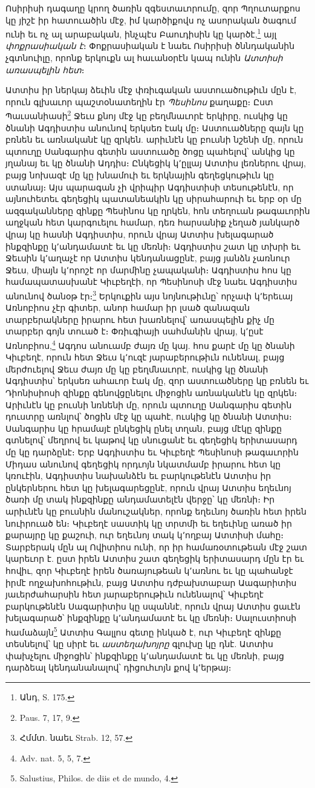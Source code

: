 \documentclass{article}
\begin{document}
{Ոսիրիսի դագաղը կրող ծառին զգեստաւորումը, զոր Պղուտարքոս կը յիշէ իր հատուածին մէջ, իմ կարծիքովս ոչ ասորական ծագում ունի եւ ոչ ալ արաբական, ինչպէս Բաուդիսին կը կարծէ,\footnote{Անդ, S. 175.} այլ \emph{փոքրասիական է}։ Փոքրասիական է նաեւ Ոսիրիսի ծննդականին չգտնուիլը, որոնք երկուքն ալ հաւանօրէն կապ ունին \emph{Ատտիսի առասպելին հետ}։

Ատտիս իր ներկայ ձեւին մէջ փռիւգական աստուածութիւն մըն է, որուն գլխաւոր պաշտօնատեղին էր \emph{Պեսինոս} քաղաքը։ Ըստ Պաւսանիասի\footnote{Paus. 7, 17, 9.} Ջեւս քնոյ մէջ կը բեղմնաւորէ երկիրը, ուսկից կը ծնանի Ագդիստիս անունով երկսեռ էակ մը։ Աստուածները զայն կը բռնեն եւ առնականէ կը զրկեն. արիւնէն կը բուսնի նշենի մը, որուն պտուղը Սանգարիս գետին աստուածը ծոցը պահելով՝ անկից կը յղանայ եւ կը ծնանի Ադդիս։ Ընկեցիկ կ՚ըլլայ Ատտիս լեռներու վրայ, բայց նոխազէ մը կը խնամուի եւ երկնային գեղեցկութիւն կը ստանայ։ Այս պարագան չի վրիպիր Ագդիստիսի տեսութենէն, որ այնուհետեւ գեղեցիկ պատանեակին կը սիրահարուի եւ երբ օր մը ազգականները զինքը Պեսինոս կը ղրկեն, հոն տեղուան թագաւորին աղջկան հետ կարգուելու համար, դեռ հարսանիք չեղած յանկարծ վրայ կը հասնի Ագդիստիս, որուն վրայ Ատտիս խելագարած ինքզինքը կ՚անդամատէ եւ կը մեռնի։ Ագդիստիս շատ կը տխրի եւ Ջեւսին կ՚աղաչէ որ Ատտիս կենդանացընէ, բայց յանձն չառնուր Ջեւս, միայն կ՚որոշէ որ մարմինը չապականի։ Ագդիստիս հոս կը համապատասխանէ Կիւբեղէի, որ Պեսինոսի մէջ նաեւ Ագդիստիս անունով ծանօթ էր։\footnote{Հմմտ. նաեւ Strab. 12, 57.} Երկուքին այս նոյնութիւնը՝ որչափ կ՚երեւայ Առնոբիոս չէր գիտեր, անոր համար իր լսած զանազան տարբերակները իրարու հետ խառնելով՝ առասպելին քիչ մը տարբեր գոյն տուած է։ Փռիւգիայի սահմանին վրայ, կ՚ըսէ Առնոբիոս,\footnote{Adv. nat. 5, 5, 7.} Ագդոս անուամբ ժայռ մը կայ. հոս քարէ մը կը ծնանի Կիւբեղէ, որուն հետ Ջեւս կ՚ուզէ յարաբերութիւն ունենալ, բայց մերժուելով Ջեւս ժայռ մը կը բեղմնաւորէ, ուսկից կը ծնանի Ագդիստիս՝ երկսեռ ահաւոր էակ մը, զոր աստուածները կը բռնեն եւ Դիոնիսիոսի զինքը գենովցընելու միջոցին առնականէն կը զրկեն։ Արիւնէն կը բուսնի նռնենի մը, որուն պտուղը Սանգարիս գետին դուստրը առնլով՝ ծոցին մէջ կը պահէ, ուսկից կը ծնանի Ատտիս։ Սանգարիս կը հրամայէ ընկեցիկ ընել տղան, բայց մէկը զինքը գտնելով՝ մեղրով եւ կաթով կը սնուցանէ եւ գեղեցիկ երիտասարդ մը կը դարձընէ։ Երբ Ագդիստիս եւ Կիւբեղէ Պեսինոսի թագաւորին Միդաս անունով գեղեցիկ որդւոյն նկատմամբ իրարու հետ կը կռուէին, Ագդիստիս նախանձէն եւ բարկութենէն Ատտիս իր ընկերներու հետ կը խելագարեցընէ, որուն վրայ Ատտիս եղեւնոյ ծառի մը տակ ինքզինքը անդամատելէն վերջը՝ կը մեռնի։ Իր արիւնէն կը բուսնին մանուշակներ, որոնք եղեւնոյ ծառին հետ իրեն նուիրուած են։ Կիւբեղէ սաստիկ կը տրտմի եւ եղեւինը առած իր քարայրը կը քաշուի, ուր եղեւնոյ տակ կ՚ողբայ Ատտիսի մահը։ Տարբերակ մըն ալ Ովիտիոս ունի, որ իր համառօտութեան մէջ շատ կարեւոր է. ըստ իրեն Ատտիս շատ գեղեցիկ երիտասարդ մըն էր եւ հովիւ, զոր Կիւբեղէ իրեն ծառայութեան կ՚առնու եւ կը պահանջէ իրմէ ողջախոհութիւն, բայց Ատտիս դժբախտաբար Աագարիտիս յաւերժահարսին հետ յարաբերութիւն ունենալով՝ Կիւբեղէ բարկութենէն Սագարիտիս կը սպաննէ, որուն վրայ Ատտիս ցաւէն խելագարած՝ ինքզինքը կ՚անդամատէ եւ կը մեռնի։ Սալուստիոսի համաձայն\footnote{Salustius, Philos. de diis et de mundo, 4.} Ատտիս Գալլոս գետը ինկած է, ուր Կիւբեղէ զինքը տեսնելով՝ կը սիրէ եւ \emph{աստեղախոյրը} գլուխը կը դնէ. Ատտիս փախչելու միջոցին՝ ինքզինքը կ՚անդամատէ եւ կը մեռնի, բայց դարձեալ կենդանանալով՝ դիցուհւոյն քով կ՚երթայ։

}
\end{document}
